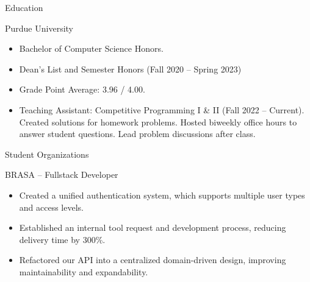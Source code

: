 \documentclass[]{article}
\newlength{\tabin}
\newlength{\secsep}
\newcommand{\lineunder}{\vspace*{-8pt} \\ \hspace*{-6pt} \hrulefill \\ \vspace*{-15pt}}
\newenvironment{tabbedsection}[1]{
  \begin{list}{}{
      \setlength{\itemsep}{0pt}
      \setlength{\labelsep}{0pt}
      \setlength{\labelwidth}{0pt}
      \setlength{\leftmargin}{\tabin}
      \setlength{\rightmargin}{\tabin}
      \setlength{\listparindent}{0pt}
      \setlength{\parsep}{0pt}
      \setlength{\parskip}{0pt}
      \setlength{\partopsep}{0pt}
      \setlength{\topsep}{#1}
    }
  \item[]
}{\end{list}}
\newenvironment{resume_section}[1]{
  \filbreak
  \vspace{2\secsep}
  \textsc{\large#1}
  \lineunder
  \begin{tabbedsection}{\secsep}
}{\end{tabbedsection}}
\newenvironment{resume_subsection}[2][]{
  \textbf{#2} \hfill {\footnotesize #1} \hspace{2em}
  \begin{tabbedsection}{0.5\secsep}
}{\end{tabbedsection}}
\newenvironment{subitems}{
  \renewcommand{\labelitemi}{-}
  \begin{itemize}
      \setlength{\labelsep}{1em}
}{\end{itemize}}
\begin{document}

\begin{resume_section}{Education}

	\begin{resume_subsection}{Purdue University}

		\begin{subitems}

			\item Bachelor of Computer Science Honors.
			
			\item Dean's List and Semester Honors (Fall 2020 -- Spring 2023)

			\item Grade Point Average: 3.96 / 4.00.

			\item Teaching Assistant: Competitive Programming I \& II (Fall 2022 -- Current).
			Created solutions for homework problems. Hosted biweekly office hours to answer
			student questions. Lead problem discussions after class.

		\end{subitems}

	\end{resume_subsection}

\end{resume_section}


\begin{resume_section}{Student Organizations}

	\begin{resume_subsection}[Remote (2021.08 -- 2022.08)]{BRASA -- Fullstack Developer}

		\begin{subitems}

			\item Created a unified authentication system, which supports multiple user types and
			access levels.

			\item Established an internal tool request and development process, reducing delivery
			time by 300\%.

			\item Refactored our API into a centralized domain-driven design, improving
			maintainability and expandability.

		\end{subitems}

	\end{resume_subsection}

\end{resume_section}
\end{document}
